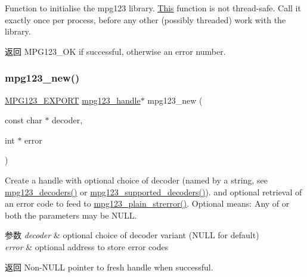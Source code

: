 Function to initialise the mpg123 library. \hyperlink{namespace_this}{This} function is not thread-\/safe. Call it exactly once per process, before any other (possibly threaded) work with the library.

\begin{DoxyReturn}{返回}
M\+P\+G123\+\_\+\+OK if successful, otherwise an error number. 
\end{DoxyReturn}
\mbox{\label{group__mpg123__init_ga1413635a4b699acdf3b19bd9d2257557}} 
\subsubsection{\texorpdfstring{mpg123\+\_\+new()}{mpg123\_new()}}
{\footnotesize\ttfamily \hyperlink{mpg123_8h_a2ba98cfba3f760879df70e755b2a61cc}{M\+P\+G123\+\_\+\+E\+X\+P\+O\+RT} \hyperlink{group__mpg123__init_ga6728e2839a395f3a07d4514da659faca}{mpg123\+\_\+handle}$\ast$ mpg123\+\_\+new (\begin{DoxyParamCaption}\item[{const char $\ast$}]{decoder,  }\item[{int $\ast$}]{error }\end{DoxyParamCaption})}

Create a handle with optional choice of decoder (named by a string, see \hyperlink{group__mpg123__decoder_gaaa1b0af58f5f9654c736ccb24dcf0475}{mpg123\+\_\+decoders()} or \hyperlink{group__mpg123__decoder_gaa74de136a5a49d0b420707e98e91a789}{mpg123\+\_\+supported\+\_\+decoders()}). and optional retrieval of an error code to feed to \hyperlink{group__mpg123__error_gacf2c837729218ae3681e3fdb03cda529}{mpg123\+\_\+plain\+\_\+strerror()}. Optional means\+: Any of or both the parameters may be N\+U\+LL.


\begin{DoxyParams}{参数}
{\em decoder} & optional choice of decoder variant (N\+U\+LL for default) \\
\hline
{\em error} & optional address to store error codes \\
\hline
\end{DoxyParams}
\begin{DoxyReturn}{返回}
Non-\/\+N\+U\+LL pointer to fresh handle when successful. 
\end{DoxyReturn}
\mbox{\label{group__mpg123__init_gad2c81c9b8abeccd5e0e8a01e6744d806}} 
